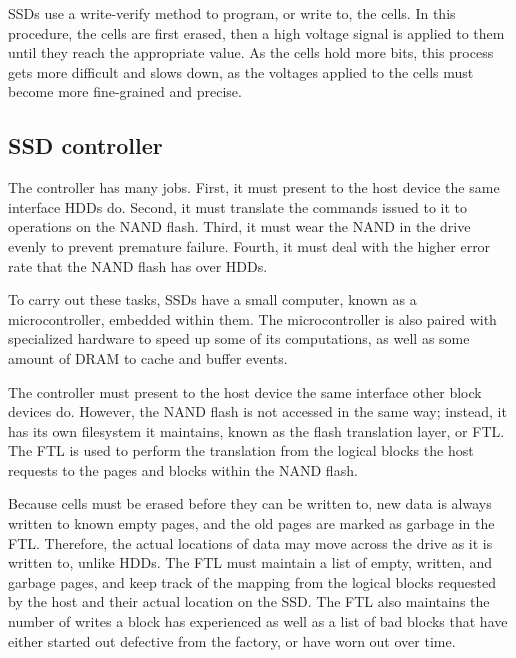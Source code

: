 \documentclass[format=acmsmall, review=false, screen=true]{acmart}
\begin{document}
SSDs use a write-verify method to program, or write to, the cells. In this procedure, the cells are first erased, then 
a high voltage signal is applied to them until they reach the appropriate value. As the cells hold more bits, this 
process gets more difficult and slows down, as the voltages applied to the cells must become more fine-grained and precise.
\cite{Dirik2009, Cornwell2012, Micheloni2013, Chen2016}

\subsection{SSD controller}

The controller has many jobs. First, it must present to the host device the same interface HDDs do. Second, it must 
translate the commands issued to it to operations on the NAND flash. Third, it must wear the NAND in the drive evenly 
to prevent premature failure. Fourth, it must deal with the higher error rate that the NAND flash has over HDDs. 
\cite{Dirik2009, Cornwell2012, Micheloni2013, MatejFucek2014, Chen2016}

To carry out these tasks, SSDs have a small computer, known as a microcontroller, embedded within them. The microcontroller 
is also paired with specialized hardware to speed up some of its computations, as well as some amount of DRAM to cache and 
buffer events. \cite{Dirik2009, Cornwell2012, Micheloni2013, MatejFucek2014, Chen2016}

The controller must present to the host device the same interface other block devices do. However, the NAND flash is not 
accessed in the same way; instead, it has its own filesystem it maintains, known as the flash translation layer, or FTL. 
The FTL is used to perform the translation from the logical blocks the host requests to the pages and blocks within the 
NAND flash. \cite{Cornwell2012, Micheloni2013, MatejFucek2014, Chen2016}

Because cells must be erased before they can be written to, new data is always written to known empty pages, and the old 
pages are marked as garbage in the FTL. Therefore, the actual locations of data may move across the drive as it is written 
to, unlike HDDs. The FTL must maintain a list of empty, written, and garbage pages, and keep track of the mapping from 
the logical blocks requested by the host and their actual location on the SSD. The FTL also maintains the number of writes 
a block has experienced as well as a list of bad blocks that have either started out defective from the factory, or have 
worn out over time. \cite{Dirik2009, Cornwell2012, Micheloni2013, MatejFucek2014, Chen2016}
\end{document}
